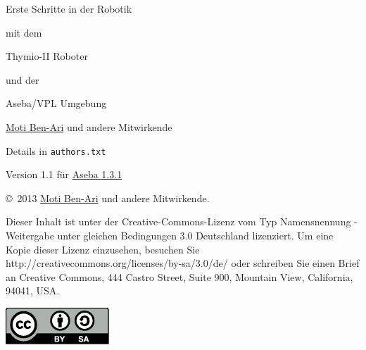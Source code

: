 \thispagestyle{empty}

\begin{center}
\begin{Huge}
\begin{bfseries}
Erste Schritte in der Robotik
\end{bfseries}

mit dem 

\begin{bfseries}
Thymio-II Roboter
\end{bfseries}

und der

\begin{bfseries}
Aseba/VPL Umgebung
\end{bfseries}

\end{Huge}

\vskip 2cm


\begin{LARGE}
\href{http://www.weizmann.ac.il/sci-tea/benari/}{Moti Ben-Ari} und andere Mitwirkende\\
\end{LARGE}
\bigskip
\begin{Large}
Details in \texttt{authors.txt} 
\end{Large}

\vskip 1cm

\begin{Large}
Version 1.1 für \href{https://aseba.wikidot.com/de:downloadinstall}{Aseba 1.3.1}
\end{Large}

\end{center}

\vfill

\begin{center}
\copyright{}\  2013 \href{http://www.weizmann.ac.il/sci-tea/benari/}{Moti Ben-Ari} und andere Mitwirkende.
\end{center}

Dieser Inhalt ist unter der Creative-Commons-Lizenz vom Typ Namensnennung -
Weitergabe unter gleichen Bedingungen 3.0 Deutschland lizenziert. Um eine Kopie
dieser Lizenz einzusehen, besuchen Sie
http://creativecommons.org/licenses/by-sa/3.0/de/ oder schreiben Sie einen
Brief an Creative Commons, 444 Castro Street, Suite 900, Mountain View,
California, 94041, USA.

\begin{center}
\includegraphics[width=.2\textwidth]{../images/by-sa}
\end{center}

\tableofcontents
\thispagestyle{empty}
